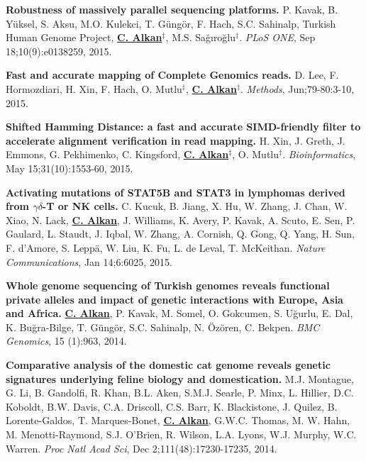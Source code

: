   \vspace{-.2cm}        
  {\bf Robustness of massively parallel sequencing platforms.}
  P. Kavak, B. Yüksel, S. Aksu, M.O. Kulekci, T. Güngör, F. Hach, S.C. Sahinalp, Turkish Human Genome Project, {\bf {\underline {C. Alkan}}}$^\ddag$,
  M.S. Sağıroğlu$^\ddag$.    
  {\em PLoS ONE},  Sep 18;10(9):e0138259, 2015.  

  \vspace{-.2cm}        
  {\bf Fast and accurate mapping of Complete Genomics reads.}
  D. Lee, F. Hormozdiari, H. Xin, F. Hach, O. Mutlu$^\ddag$,  {\bf {\underline {C. Alkan}}}$^\ddag$.
  {\em Methods}, Jun;79-80:3-10, 2015. 

  \vspace{-.2cm}        
  {\bf Shifted Hamming Distance: a fast and accurate SIMD-friendly filter to accelerate alignment verification in read mapping.} H. Xin, J. Greth, J. Emmons, 
G. Pekhimenko, C. Kingsford, {\bf {\underline{C. Alkan}}}$^\ddag$,  O. Mutlu$^\ddag$. {\em Bioinformatics},  May 15;31(10):1553-60, 2015.


  \vspace{-.2cm}        
  {\bf Activating mutations of STAT5B and STAT3 in lymphomas derived from $\gamma\delta$-T or NK cells.}
   C. Kucuk, B. Jiang, X. Hu, W. Zhang, J. Chan, W. Xiao, N. Lack,   {\bf {\underline {C. Alkan}}},  J. Williams, K. Avery, P. Kavak, A. Scuto, E. Sen,  P. Gaulard, L. Staudt, J. Iqbal,  W. Zhang,  A. Cornish, Q. Gong, Q.  Yang, H. Sun, F. d'Amore, S. Leppä, W. Liu, K. Fu, L. de Leval, T. McKeithan.
 {\em Nature Communications}, Jan 14;6:6025, 2015.


  \vspace{-.2cm}        
  {\bf Whole genome sequencing of Turkish genomes reveals functional private alleles and impact of genetic interactions with Europe, Asia and Africa.}
  {\bf {\underline {C. Alkan}}}, P. Kavak, M. Somel, O. Gokcumen, S. Uğurlu, E. Dal, K. Buğra-Bilge,  T. Güngör, S.C. Sahinalp, N. Özören, C. Bekpen.
  {\em BMC Genomics}, 15 (1):963, 2014.

  \vspace{-.2cm}        
  {\bf Comparative analysis of the domestic cat genome reveals genetic signatures underlying feline biology and domestication.}
  M.J. Montague, G. Li, B. Gandolfi, R. Khan, B.L. Aken, S.M.J. Searle, P. Minx, L. Hillier, D.C. Koboldt, B.W. Davis, C.A. Driscoll, 
  C.S. Barr, K. Blackistone, J. Quilez, B. Lorente-Galdos, T. Marques-Bonet, {\bf {\underline {C. Alkan}}}, G.W.C. Thomas, M. W. Hahn, M. Menotti-Raymond, 
  S.J. O’Brien, R. Wilson, L.A. Lyons, W.J. Murphy, W.C. Warren. {\em Proc Natl Acad Sci}, Dec 2;111(48):17230-17235, 2014.

